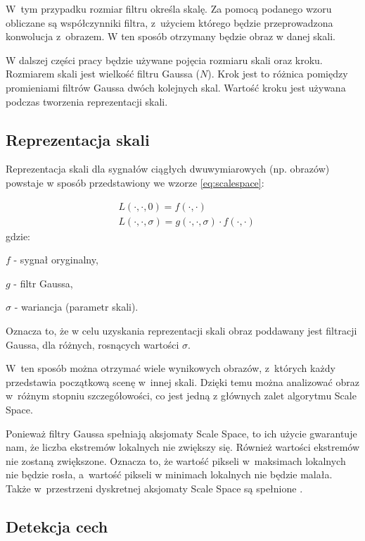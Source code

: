 W~tym przypadku rozmiar filtru określa skalę. Za pomocą podanego wzoru obliczane są współczynniki filtra, z~użyciem którego będzie przeprowadzona konwolucja z~obrazem. W ten sposób otrzymany będzie obraz w danej skali.

W dalszej części pracy będzie używane pojęcia rozmiaru skali oraz kroku. Rozmiarem skali jest wielkość filtru Gaussa ($N$). Krok jest to różnica pomiędzy promieniami filtrów Gaussa dwóch kolejnych skal. Wartość kroku jest używana podczas tworzenia reprezentacji skali.

\subsection{Reprezentacja skali}
\label{subsec:reprezentacjaskali}
Reprezentacja skali dla sygnałów ciągłych dwuwymiarowych (np. obrazów) powstaje w sposób przedstawiony we wzorze \eqref{eq:scalespace}:

\begin{equation}
\label{eq:scalespace}
\begin{split}
& L(\cdot,\cdot,0) = f(\cdot,\cdot) \\
& L(\cdot,\cdot,\sigma) = g(\cdot,\cdot,\sigma)\cdot f(\cdot,\cdot)
\end{split}
\end{equation}
gdzie:

$ f $ - sygnał oryginalny,

$ g $ - filtr Gaussa, 

$ \sigma $ - wariancja (parametr skali).

Oznacza to, że w celu uzyskania reprezentacji skali obraz poddawany jest filtracji Gaussa, dla różnych, rosnących wartości $ \sigma $.

W~ten sposób można otrzymać wiele wynikowych obrazów, z~których każdy przedstawia początkową scenę w~innej skali. Dzięki temu można analizować obraz w~różnym stopniu szczegółowości, co jest jedną z głównych zalet algorytmu Scale Space.

Ponieważ filtry Gaussa spełniają aksjomaty Scale Space, to ich użycie gwarantuje nam, że liczba ekstremów lokalnych nie zwiększy się. Również wartości ekstremów nie zostaną zwiększone. Oznacza to, że wartość pikseli w~maksimach lokalnych nie będzie rosła, a~wartość pikseli w minimach lokalnych nie będzie malała. Także w~przestrzeni dyskretnej aksjomaty Scale Space są spełnione \cite{SSFDS}.

\subsection{Detekcja cech}
\label{subsec:detekcja}


